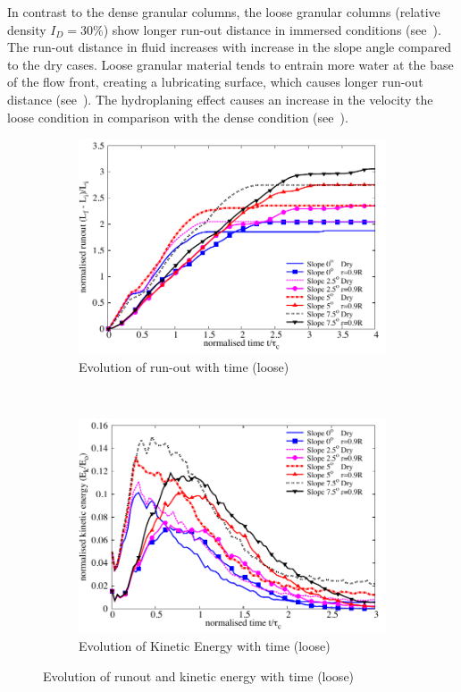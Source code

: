 In contrast to the dense granular columns, the loose granular columns (relative density $I_D=30 \%$) show longer run-out distance in immersed conditions (see~). The run-out distance in fluid increases with increase in the slope angle compared to the dry cases. Loose granular material tends to entrain more water at the base of the flow front, creating a lubricating surface, which causes longer run-out distance (see~). The hydroplaning effect causes an increase in the velocity the loose condition in comparison with the dense condition (see~).

\begin{figure}
\centering
\begin{subfigure}[b]{0.95\textwidth}
\centering
\includegraphics[width=0.97\columnwidth]{Runout_loose_slope}
\caption{Evolution of run-out with time (loose)}
\label{fig:run_loose}
\end{subfigure} \\
\begin{subfigure}[b]{0.95\textwidth}
\centering
\includegraphics[width=0.97\columnwidth]{KE_loose_slope}
\caption{Evolution of Kinetic Energy with time (loose)}
\label{fig:KE_loose}
\end{subfigure}
\caption{Evolution of runout and kinetic energy with time (loose)}
\label{fig:KE_run_loose}
\end{figure}

